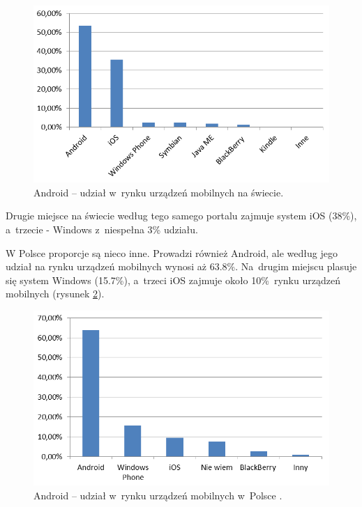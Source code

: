 \newpage
\begin{figure}[!htb]
    \centering
    \includegraphics[width=12cm]{imgs/ch2_android_udzial_2pl.png}
    \caption
{Android – udział w~rynku urządzeń mobilnych na świecie\cite{website:android:stat2}.}
    \label{fig:android_udzial_zagranica}
\end{figure} 

Drugie miejsce na świecie według tego samego portalu zajmuje system iOS (38\%), a~trzecie - Windows z~niespełna 3\% udziału. 

W Polsce proporcje są nieco inne. Prowadzi również Android, ale według \cite{website:android:stat1} jego udział na rynku urządzeń mobilnych wynosi aż 63.8\%. Na~drugim miejscu plasuje się system Windows (15.7\%), a~trzeci iOS zajmuje około 10\%~rynku urządzeń mobilnych (rysunek \ref{fig:android_udzial_polska}).

\begin{figure}[!htb]
    \centering
    \includegraphics[width=12cm]{imgs/ch2_android_udzial_1pl.png}
    \caption
{Android – udział w~rynku urządzeń mobilnych w~Polsce \cite{website:android:stat1}.}
    \label{fig:android_udzial_polska}
\end{figure} 

